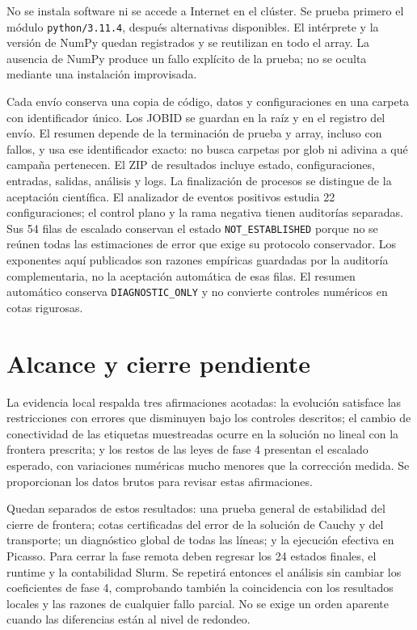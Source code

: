 \documentclass[11pt,a4paper]{article}
\begin{document}
No se instala software ni se accede a Internet en el clúster. Se prueba primero el módulo \texttt{python/3.11.4}, después alternativas disponibles. El intérprete y la versión de NumPy quedan registrados y se reutilizan en todo el array. La ausencia de NumPy produce un fallo explícito de la prueba; no se oculta mediante una instalación improvisada.

Cada envío conserva una copia de código, datos y configuraciones en una carpeta con identificador único. Los JOBID se guardan en la raíz y en el registro del envío. El resumen depende de la terminación de prueba y array, incluso con fallos, y usa ese identificador exacto: no busca carpetas por glob ni adivina a qué campaña pertenecen. El ZIP de resultados incluye estado, configuraciones, entradas, salidas, análisis y logs. La finalización de procesos se distingue de la aceptación científica. El analizador de eventos positivos estudia 22 configuraciones; el control plano y la rama negativa tienen auditorías separadas. Sus 54 filas de escalado conservan el estado \texttt{NOT\_ESTABLISHED} porque no se reúnen todas las estimaciones de error que exige su protocolo conservador. Los exponentes aquí publicados son razones empíricas guardadas por la auditoría complementaria, no la aceptación automática de esas filas. El resumen automático conserva \texttt{DIAGNOSTIC\_ONLY} y no convierte controles numéricos en cotas rigurosas.

\section{Alcance y cierre pendiente}
La evidencia local respalda tres afirmaciones acotadas: la evolución satisface las restricciones con errores que disminuyen bajo los controles descritos; el cambio de conectividad de las etiquetas muestreadas ocurre en la solución no lineal con la frontera prescrita; y los restos de las leyes de fase 4 presentan el escalado esperado, con variaciones numéricas mucho menores que la corrección medida. Se proporcionan los datos brutos para revisar estas afirmaciones.

Quedan separados de estos resultados: una prueba general de estabilidad del cierre de frontera; cotas certificadas del error de la solución de Cauchy y del transporte; un diagnóstico global de todas las líneas; y la ejecución efectiva en Picasso. Para cerrar la fase remota deben regresar los 24 estados finales, el runtime y la contabilidad Slurm. Se repetirá entonces el análisis sin cambiar los coeficientes de fase 4, comprobando también la coincidencia con los resultados locales y las razones de cualquier fallo parcial. No se exige un orden aparente cuando las diferencias están al nivel de redondeo.
\end{document}
